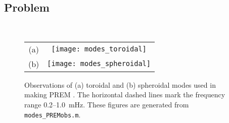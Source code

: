 \documentclass[11pt,titlepage,fleqn]{article}
\begin{document}

\subsection*{Problem} \howmuchtime\




\clearpage\pagebreak


\begin{figure}
\centering
\begin{tabular}{cc}
(a) & \texttt{[image: modes\_toroidal]} \\
(b) & \texttt{[image: modes\_spheroidal]}
\end{tabular}
\caption[]
{{
Observations of (a) toroidal and (b) spheroidal modes used in making PREM \citep{PREM}.
The horizontal dashed lines mark the frequency range 0.2--1.0~mHz.
These figures are generated from {\tt modes\_PREMobs.m}.
}}
\label{fig:premmodes}
\end{figure}


\clearpage\pagebreak



\end{document}
